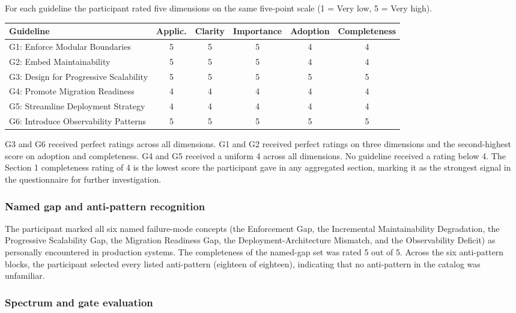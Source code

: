 For each guideline the participant rated five dimensions on the same five-point scale (1 = Very low, 5 = Very high).

\begin{longtable}{p{5cm} c c c c c}
\toprule
\textbf{Guideline} & \textbf{Applic.} & \textbf{Clarity} & \textbf{Importance} & \textbf{Adoption} & \textbf{Completeness} \\
\midrule
\endhead
G1: Enforce Modular Boundaries  & 5 & 5 & 5 & 4 & 4 \\
G2: Embed Maintainability       & 5 & 5 & 5 & 4 & 4 \\
G3: Design for Progressive Scalability & 5 & 5 & 5 & 5 & 5 \\
G4: Promote Migration Readiness & 4 & 4 & 4 & 4 & 4 \\
G5: Streamline Deployment Strategy & 4 & 4 & 4 & 4 & 4 \\
G6: Introduce Observability Patterns & 5 & 5 & 5 & 5 & 5 \\
\bottomrule
\end{longtable}

G3 and G6 received perfect ratings across all dimensions. G1 and G2 received perfect ratings on three dimensions and the second-highest score on adoption and completeness. G4 and G5 received a uniform 4 across all dimensions. No guideline received a rating below 4. The Section 1 completeness rating of 4 is the lowest score the participant gave in any aggregated section, marking it as the strongest signal in the questionnaire for further investigation.

\subsubsection*{Named gap and anti-pattern recognition}

The participant marked all six named failure-mode concepts (the Enforcement Gap, the Incremental Maintainability Degradation, the Progressive Scalability Gap, the Migration Readiness Gap, the Deployment-Architecture Mismatch, and the Observability Deficit) as personally encountered in production systems. The completeness of the named-gap set was rated 5 out of 5. Across the six anti-pattern blocks, the participant selected every listed anti-pattern (eighteen of eighteen), indicating that no anti-pattern in the catalog was unfamiliar.

\subsubsection*{Spectrum and gate evaluation}

